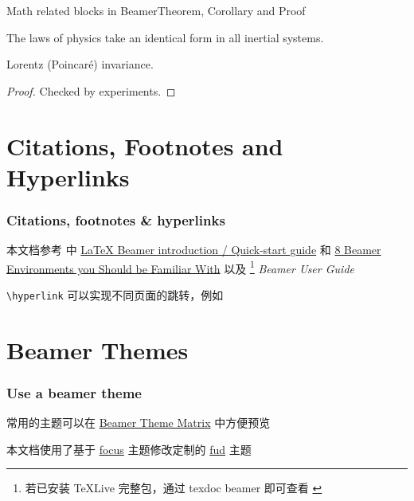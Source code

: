 \documentclass[x11names,aspectratio=32]{beamer}
\begin{document}
\begin{frame}[fragile]{Math related blocks in Beamer}{Theorem, Corollary and Proof}
    

    \begin{theorem}
        The laws of physics take an identical form in all inertial systems.
    \end{theorem}

    \begin{corollary}
        Lorentz (Poincar\'e) invariance.
    \end{corollary}

    \begin{proof}
        Checked by experiments.
    \end{proof}

\end{frame}

\section{Citations, Footnotes and Hyperlinks}
\begin{frame}[fragile]
    \frametitle{Citations, footnotes \& hyperlinks}
    

    本文档参考 \smartcite{beamer-web} 中 \href{https://latex-beamer.com/quick-start/}{LaTeX Beamer introduction / Quick-start guide} 和 \href{https://latex-beamer.com/tutorials/environments/}{8 Beamer Environments you Should be Familiar With} 以及 \footnote{若已安装 TeXLive 完整包，通过 texdoc beamer 即可查看 \cite{beamer-doc}} \emph{Beamer User Guide}\smartcite{beamer-doc}

    \verb|\hyperlink|
    可以实现不同页面的跳转\label{hyperlink}，例如 \hyperlink{tb:si-units}{}


\end{frame}


\section{Beamer Themes}
\begin{frame}[fragile]
    \frametitle{Use a beamer theme}
    

    常用的主题可以在 \href{https://hartwork.org/beamer-theme-matrix}{Beamer Theme Matrix} 中方便预览

    本文档使用了基于 \href{https://github.com/elauksap/focus-beamertheme}{focus} 主题修改定制的 \href{https://github.com/Memcys/fud-beamertheme}{fud} 主题
\end{frame}
\end{document}
